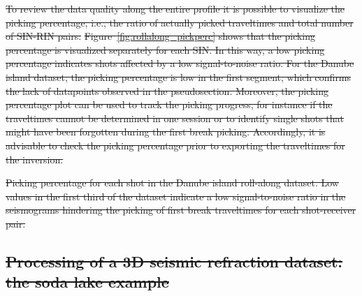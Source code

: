 \documentclass[a4paper,fleqn]{cas-sc}
\providecommand{\DIFdel}[1]{{\protect\color{red}\sout{#1}}}                      %
\providecommand{\DIFdelFL}[1]{\DIFdel{#1}} %
\begin{document}
\DIFdel{To review the data quality along the entire profile it is possible to visualize the picking percentage, i.e., the ratio of actually picked traveltimes and total number of SIN-RIN pairs:
}%
\DIFdel{Figure~\ref{fig:rollalong_pickperc} shows that the picking percentage is visualized separately for each SIN. In this way, a low picking percentage indicates shots affected by a low signal-to-noise ratio. For the Danube island dataset, the picking percentage is low in the first segment, which confirms the lack of datapoints observed in the pseudosection. Moreover, the picking percentage plot can be used to track the picking progress, for instance
if the traveltimes cannot be determined in one session or 
to identify single shots that might have been forgotten during the first break picking. Accordingly, it is advisable to check the picking percentage prior to exporting the traveltimes for the inversion.
}%

{%
\DIFdelFL{Picking percentage for each shot in the Danube island roll-along dataset. Low values in the first third of the dataset indicate a low signal-to-noise ratio in the seismograms hindering the picking of first break traveltimes for each shot-receiver pair.}}
\subsection{\DIFdel{Processing of a 3D seismic refraction dataset: the soda lake example}}
\addtocounter{subsection}{-1}%
\end{document}
